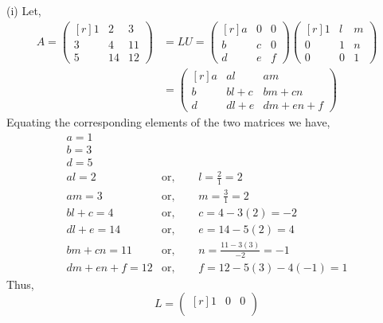 \documentclass[12pt,class=book,crop=false]{standalone}
\begin{document}
\begin{soln}
    (i) Let,
    \begin{align*}
        A=\begin{pmatrix*}[r]
            1&2&3\\
            3&4&11\\
            5&14&12
        \end{pmatrix*} & =LU=\begin{pmatrix*}[r]
            a&0&0\\
            b&c&0\\
            d&e&f
        \end{pmatrix*}\begin{pmatrix*}[r]
            1&l&m\\
            0&1&n\\
            0&0&1
        \end{pmatrix*} \\
                                     & =\begin{pmatrix*}[r]
            a&al&am\\
            b&bl+c&bm+cn\\
            d&dl+e&dm+en+f
        \end{pmatrix*}
    \end{align*}
    Equating the corresponding elements of the two matrices we have,
    \begin{align*}
         & a=1        &             &                               & \\
         & b=3        &             &                               & \\
         & d=5        &             &                               & \\
         & al=2       & \text{or, } & \quad  l=\frac{2}{1}=2        & \\
         & am=3       & \text{or, } & \quad m=\frac{3}{1}=2         & \\
         & bl+c=4     & \text{or, } & \quad c=4-3(2)=-2             & \\
         & dl+e=14    & \text{or, } & \quad e=14-5(2)=4             & \\
         & bm+cn=11   & \text{or, } & \quad n=\frac{11-3(3)}{-2}=-1 & \\
         & dm+en+f=12 & \text{or, } & \quad f=12-5(3)-4(-1)=1       &
    \end{align*}
    Thus,
    \[
        L=\begin{pmatrix*}[r]
            1&0&0\\

\end{pmatrix*}\]
\end{soln}
\end{document}
